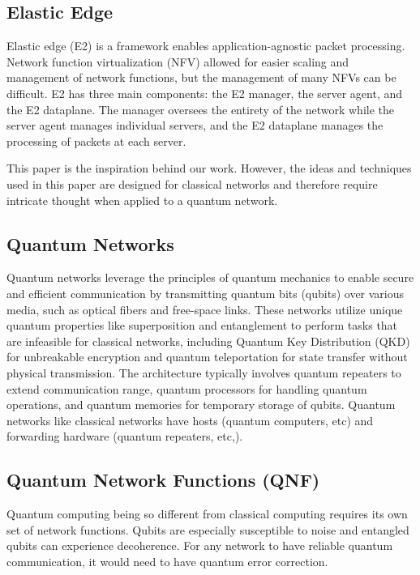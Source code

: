 \documentclass[sigplan,screen]{acmart}
\begin{document}
\subsection{Elastic Edge}
Elastic edge (E2) \cite{e2} is a framework enables application-agnostic packet processing.
Network function virtualization (NFV) allowed for easier scaling and management of network functions, but the management of many NFVs can be difficult.
E2 has three main components: the E2 manager, the server agent, and the E2 dataplane.
The manager oversees the entirety of the network while the server agent manages individual servers, and the E2 dataplane manages the processing of packets at each server.

This paper is the inspiration behind our work.
However, the ideas and techniques used in this paper are designed for classical networks and therefore require intricate thought when applied to a quantum network.


\subsection{Quantum Networks}
 Quantum networks \cite{Kimble_2008} leverage the principles of quantum mechanics to enable secure and efficient communication by transmitting quantum bits (qubits) over various media, such as optical fibers and free-space links. These networks utilize unique quantum properties like superposition and entanglement to perform tasks that are infeasible for classical networks, including Quantum Key Distribution (QKD) for unbreakable encryption and quantum teleportation for state transfer without physical transmission. The architecture typically involves quantum repeaters to extend communication range, quantum processors for handling quantum operations, and quantum memories for temporary storage of qubits. Quantum networks like classical networks have hosts (quantum computers, etc) and forwarding hardware (quantum repeaters, etc,). 

\subsection{Quantum Network Functions (QNF)}
Quantum computing being so different from classical computing requires its own set of network functions.
Qubits are especially susceptible to noise and entangled qubits can experience decoherence.
For any network to have reliable quantum communication, it would need to have quantum error correction.
\end{document}
